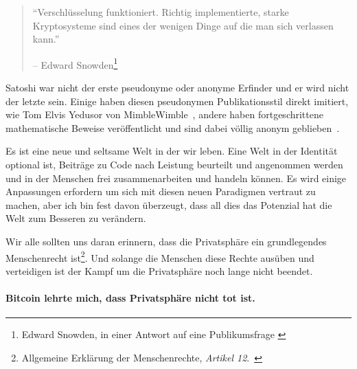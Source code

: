 \begin{quotation}\begin{samepage}
\enquote{Verschlüsselung funktioniert. Richtig implementierte, starke
Kryptosysteme sind eines der wenigen Dinge auf die man sich verlassen kann.}
\begin{flushright} -- Edward Snowden\footnote{Edward Snowden, in einer Antwort
auf eine Publikumsfrage \cite{snowden}}
\end{flushright}\end{samepage}\end{quotation}

Satoshi war nicht der erste pseudonyme oder anonyme Erfinder und er wird nicht
der letzte sein. Einige haben diesen pseudonymen Publikationsstil direkt
imitiert, wie Tom Elvis Yedusor von MimbleWimble~\cite{mimblewimble-origin},
andere haben fortgeschrittene mathematische Beweise veröffentlicht und sind
dabei völlig anonym geblieben~\cite{4chan-math}.

Es ist eine neue und seltsame Welt in der wir leben. Eine Welt in der Identität
optional ist, Beiträge zu Code nach Leistung beurteilt und angenommen werden und
in der Menschen frei zusammenarbeiten und handeln können. Es wird einige
Anpassungen erfordern um sich mit diesen neuen Paradigmen vertraut zu machen,
aber ich bin fest davon überzeugt, dass all dies das Potenzial hat die Welt zum
Besseren zu verändern.

Wir alle sollten uns daran erinnern, dass die Privatsphäre ein grundlegendes
Menschenrecht ist\footnote{Allgemeine Erklärung der Menschenrechte,
\textit{Artikel 12}.~\cite{article12}}. Und solange die Menschen diese Rechte
ausüben und verteidigen ist der Kampf um die Privatsphäre noch lange nicht
beendet.

\paragraph{Bitcoin lehrte mich, dass Privatsphäre nicht tot ist.}

%
%
%
%
